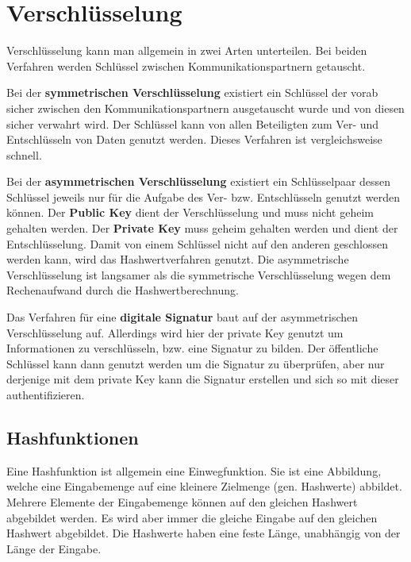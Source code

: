 \section{Verschlüsselung}

Verschlüsselung kann man allgemein in zwei Arten unterteilen. Bei beiden Verfahren werden Schlüssel zwischen Kommunikationspartnern getauscht.

Bei der \textbf{symmetrischen Verschlüsselung} existiert ein Schlüssel der vorab sicher zwischen den Kommunikationspartnern ausgetauscht wurde und von diesen sicher verwahrt wird. Der Schlüssel kann von allen Beteiligten zum Ver- und Entschlüsseln von Daten genutzt werden. Dieses Verfahren ist vergleichsweise schnell.

Bei der \textbf{asymmetrischen Verschlüsselung} existiert ein Schlüsselpaar dessen Schlüssel jeweils nur für die Aufgabe des Ver- bzw. Entschlüsseln genutzt werden können. Der \textbf{Public Key} dient der Verschlüsselung und muss nicht geheim gehalten werden. Der \textbf{Private Key} muss geheim gehalten werden und dient der Entschlüsselung. Damit von einem Schlüssel nicht auf den anderen geschlossen werden kann, wird das Hashwertverfahren genutzt. Die asymmetrische Verschlüsselung ist langsamer als die symmetrische Verschlüsselung wegen dem Rechenaufwand durch die Hashwertberechnung.

Das Verfahren für eine \textbf{digitale Signatur} baut auf der asymmetrischen Verschlüsselung auf. Allerdings wird hier der private Key genutzt um Informationen zu verschlüsseln, bzw. eine Signatur zu bilden. Der öffentliche Schlüssel kann dann genutzt werden um die Signatur zu überprüfen, aber nur derjenige mit dem private Key kann die Signatur erstellen und sich so mit dieser authentifizieren.

\subsection{Hashfunktionen}

Eine Hashfunktion ist allgemein eine Einwegfunktion. Sie ist eine Abbildung, welche eine Eingabemenge auf eine kleinere Zielmenge (gen. Hashwerte) abbildet. Mehrere Elemente der Eingabemenge können auf den gleichen Hashwert abgebildet werden. Es wird aber immer die gleiche Eingabe auf den gleichen Hashwert abgebildet. Die Hashwerte haben eine feste Länge, unabhängig von der Länge der Eingabe. 